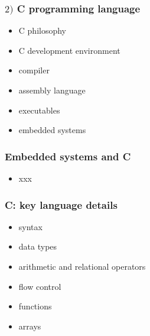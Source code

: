 \documentclass[english,14pt]{beamer}
\begin{document}

\begin{frame}[fragile]

\frametitle{$2)$ C programming language}

\begin{itemize}
	\item C philosophy
	\item C development environment
	\item compiler
	\item assembly language
	\item executables
	\item embedded systems
\end{itemize}

\end{frame}


\begin{frame}[fragile]

\frametitle{Embedded systems and C}

\begin{itemize}
	\item xxx
\end{itemize}

\end{frame}


\begin{frame}[fragile]

\frametitle{C: key language details}

\begin{itemize}
	\item syntax
	\item data types
	\item arithmetic and relational operators
	\item flow control
	\item functions
	\item arrays
\end{itemize}


\end{frame}
\end{document}
